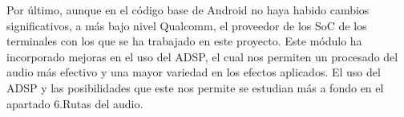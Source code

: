 Por último, aunque en el código base de Android no haya habido cambios significativos, a más bajo nivel Qualcomm, el proveedor de los \gls{SoC} de los terminales con los que se ha trabajado en este proyecto. Este módulo ha incorporado mejoras en el uso del \gls{ADSP}, el cual nos permiten un procesado del audio más efectivo y una mayor variedad en los efectos aplicados. El uso del \gls{ADSP} y las posibilidades que este nos permite se estudian más a fondo en el apartado 6.Rutas del audio. %